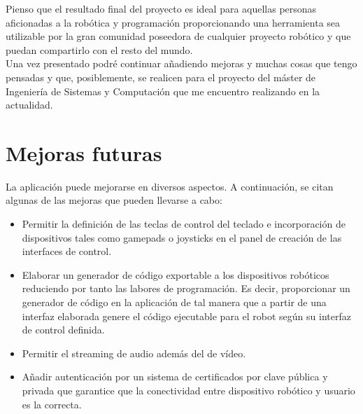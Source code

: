 \documentclass[a4paper,12pt]{article}
\begin{document}
Pienso que el resultado final del proyecto es ideal para aquellas personas aficionadas a la robótica y programación proporcionando una herramienta sea utilizable por la gran comunidad poseedora 
de cualquier proyecto robótico y que puedan compartirlo con el resto del mundo.\\

Una vez presentado podré continuar añadiendo mejoras y muchas cosas que tengo pensadas y que, posiblemente, se realicen para el proyecto del máster de Ingeniería de Sistemas y Computación que me 
encuentro realizando en la actualidad.\\

\section{Mejoras futuras}

La aplicación puede mejorarse en diversos aspectos. A continuación, se citan algunas de las mejoras que pueden llevarse a cabo:

\begin{itemize}
  \item Permitir la definición de las teclas de control del teclado e incorporación de dispositivos tales como gamepads o joysticks en el panel de creación de las interfaces de control.
  \item Elaborar un generador de código exportable a los dispositivos robóticos reduciendo por tanto las labores de programación. Es decir, proporcionar un generador de código
  en la aplicación de tal manera que a partir de una interfaz elaborada genere el código ejecutable para el robot según su interfaz de control definida.\\
  \item Permitir el streaming de audio además del de vídeo.\\
  \item Añadir autenticación por un sistema de certificados por clave pública y privada que garantice que la conectividad entre dispositivo robótico y usuario es la correcta.\\
\end{itemize}

\clearpage

\nocite{*}
{}

\pagestyle{empty}
\end{document}
